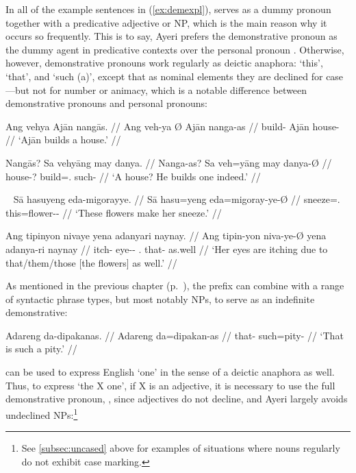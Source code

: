 \xe


In all of the example sentences in (\ref{ex:demexpl}),
 serves as a dummy pronoun together with a
predicative adjective or NP, which is the main reason why it occurs so
frequently. This is to say, Ayeri prefers the demonstrative pronoun
 as the dummy agent in predicative contexts over the
personal pronoun . Otherwise, however, demonstrative
pronouns work regularly as deictic anaphora: `this', `that', and `such (a)',
except that as nominal elements they are declined for case---but not for number
or animacy, which is a notable difference between demonstrative pronouns and
personal pronouns:

\pex
\a\begingl
	\gla Ang vehya {} Ajān nangās. //
	\glb Ang veh-ya Ø Ajān nanga-as //
	\glc \AgtT{} build-\TsgM{} \Top{} Ajān house-\Parg{} //
	\glft `Ajān builds a house.' //
\endgl

\a\begingl
	\gla Nangās? Sa vehyāng may danya. //
	\glb Nanga-as? Sa veh=yāng may danya-Ø //
	\glc house-\Parg{}? \PatT{} build=\TsgM{}.\Aarg{} \Aff{} such-\Top{} //
	\glft `A house? He builds one indeed.' //
\endgl

\xe

\pex~
\a\begingl
	\gla Sā hasuyeng eda-migorayye. //
	\glb Sā hasu=yeng eda=migoray-ye-Ø //
	\glc \CauT{} sneeze=\TsgF{}.\Aarg{} this=flower-\Pl{}-\Top{} //
	\glft `These flowers make her sneeze.' //
\endgl

\a\begingl
	\gla Ang tipinyon nivaye yena adanyari naynay. //
	\glb Ang tipin-yon niva-ye-Ø yena adanya-ri naynay //
	\glc \AgtT{} itch-\TplN{} eye-\Pl{}-\Top{} \TsgF{}.\Gen{} that-\Caus{} 
		as.well //
	\glft `Her eyes are itching due to that/them/those [the flowers] as 
		well.' //
\endgl
\xe

As mentioned in the previous chapter (p.~\pageref{nounprefixes}), the prefix 
 can combine with a range of syntactic phrase types, 
but most notably NPs, to serve as an indefinite demonstrative:

\ex\begingl
	\gla Adareng da-dipakanas. //
	\glb Adareng da=dipakan-as //
	\glc that-\AargI{} such=pity-\Parg{} //
	\glft `That is such a pity.' //
\endgl\xe

 can be used to express English `one' in the sense of a deictic
anaphora as well. Thus, to express `the X one', if X is an adjective, it is
necessary to use the full demonstrative pronoun, , since
adjectives do not decline, and Ayeri largely avoids undeclined
NPs:\footnote{See \autoref{subsec:uncased} above for examples of situations
where nouns regularly do not exhibit case marking.}

